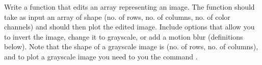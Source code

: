 %
%
%

\begin{problem}
Write a function that edits an array representing an image. The function should take as input 
an array of shape (no. of rows, no. of columns, no. of color channels) and should then plot the edited
image. Include options that allow you to  invert the image, change it to grayscale, or add a motion blur (definitions below).
Note that the shape of a grayscale image is (no. of rows, no. of columns), and to plot a 
grayscale image  you need to you the command .
\end{problem}

